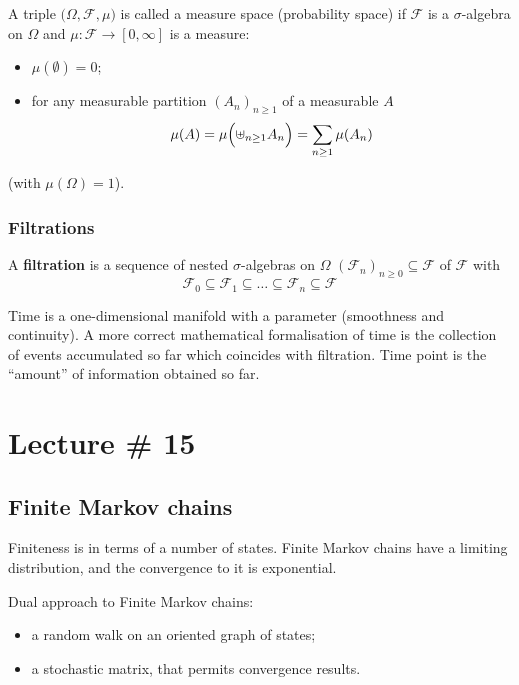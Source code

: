 \documentclass[a4paper]{article}
\newcommand{\Fcal}{\mathcal{F}}
\begin{document}
A triple $\bigl(\Omega, \Fcal, \mu \bigr)$ is called a measure space (probability space)
if $\Fcal$ is a $\sigma$-algebra on $\Omega$ and $\mu:\Fcal\to[0,\infty]$ is a measure:
\begin{itemize}
	\item $\mu(\emptyset)=0$;
	\item for any measurable partition $(A_n)_{n\geq1}$ of a measurable $A$
	\[\mu(A) = \mu\Bigl(\uplus_{n\geq1} A_n\Bigr)=\sum_{n\geq1} \mu(A_n)\]
\end{itemize}
(with $\mu(\Omega) = 1$).


\subsubsection{Filtrations} %
\label{ssub:filtrations}

A \textbf{filtration} is a sequence of nested $\sigma$-algebras on $\Omega$
$(\Fcal_n)_{n\geq0} \subseteq \Fcal$ of $\Fcal$ with
\[\Fcal_0\subseteq\Fcal_1\subseteq\ldots\subseteq\Fcal_n\subseteq\Fcal\]

Time is a one-dimensional manifold with a parameter (smoothness and continuity).
A more correct mathematical formalisation of time is the collection of events
accumulated so far which coincides with filtration. Time point is the ``amount''
of information obtained so far.




\section{Lecture \# 15} %
\label{sec:lecture_15}

\subsection{Finite Markov chains} %
\label{sub:finite_markov_chains}

Finiteness is in terms of a number of states.
Finite Markov chains have a limiting distribution, and the convergence to it
is exponential.

Dual approach to Finite Markov chains:
\begin{itemize}
	\item a random walk on an oriented graph of states;
	\item a stochastic matrix, that permits convergence results.
\end{itemize}
\end{document}
